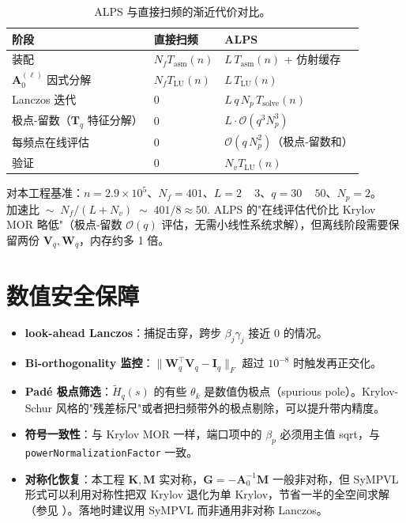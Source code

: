 \documentclass[11pt,a4paper]{ctexart}
\begin{document}
\begin{table}[h]
\centering
\begin{tabular}{lll}
\toprule
阶段 & 直接扫频 & ALPS \\
\midrule
装配 & $N_f T_{\mathrm{asm}}(n)$ & $L\,T_{\mathrm{asm}}(n)$ + 仿射缓存 \\
$\bm A_0^{(\ell)}$ 因式分解 & $N_f T_{\mathrm{LU}}(n)$ & $L\,T_{\mathrm{LU}}(n)$ \\
Lanczos 迭代 & 0 & $L\,q\,N_p\,T_{\mathrm{solve}}(n)$ \\
极点-留数（$\bm T_q$ 特征分解） & 0 & $L\cdot \mathcal O(q^3 N_p^3)$ \\
每频点在线评估 & 0 & $\mathcal O(q\,N_p^2)$（极点-留数和）\\
验证 & 0 & $N_v T_{\mathrm{LU}}(n)$ \\
\bottomrule
\end{tabular}
\caption{ALPS 与直接扫频的渐近代价对比。}
\end{table}

对本工程基准：$n=2.9\!\times\!10^5$、$N_f=401$、$L=2$ ~ $3$、$q=30$ ~ $50$、$N_p=2$。
\(
  \text{加速比} \;\sim\; N_f / (L + N_v) \;\sim\; 401/8 \approx 50.
\)
ALPS 的"在线评估代价比 Krylov MOR 略低"（极点-留数 $\mathcal O(q)$ 评估，无需小线性系统求解），但离线阶段需要保留两份 $\bm V_q,\bm W_q$，内存约多 1 倍。

\section{数值安全保障}

\begin{itemize}
\item \textbf{look-ahead Lanczos}：捕捉击穿，跨步 $\beta_j\gamma_j$ 接近 0 的情况。
\item \textbf{Bi-orthogonality 监控}：$\|\bm W_q^{\!\top}\bm V_q - \bm I_q\|_F$ 超过 $10^{-8}$ 时触发再正交化。
\item \textbf{Padé 极点筛选}：$\widetilde H_q(s)$ 的有些 $\theta_k$ 是数值伪极点（spurious pole）。Krylov-Schur 风格的"残差标尺"或者把扫频带外的极点剔除，可以提升带内精度。
\item \textbf{符号一致性}：与 Krylov MOR 一样，端口项中的 $\beta_p$ 必须用主值 sqrt，与 \texttt{powerNormalizationFactor} 一致。
\item \textbf{对称化恢复}：本工程 $\bm K,\bm M$ 实对称，$\bm G = -\bm A_0^{-1}\bm M$ 一般非对称，但 SyMPVL 形式可以利用对称性把双 Krylov 退化为单 Krylov，节省一半的全空间求解（参见 \cite{Freund2000}）。落地时建议用 SyMPVL 而非通用非对称 Lanczos。
\end{itemize}
\end{document}

